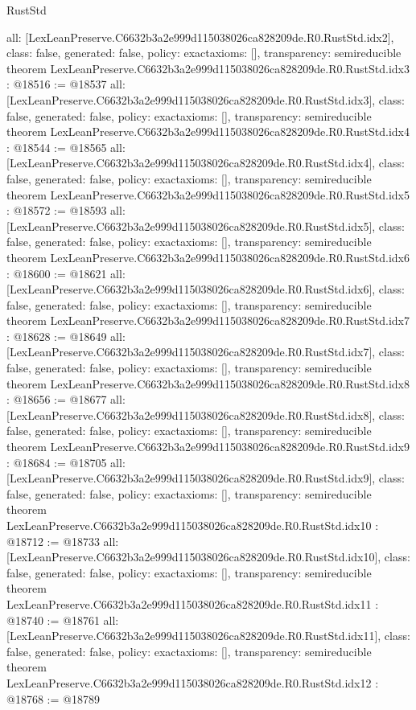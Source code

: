 \begin{lexlean}{RustStd}
\begin{coremodule}
{  all: [LexLeanPreserve.C6632b3a2e999d115038026ca828209de.R0.RustStd.idx2],
  class: false,
  generated: false,
  policy: exact{axioms: []},
  transparency: semireducible
}
theorem LexLeanPreserve.C6632b3a2e999d115038026ca828209de.R0.RustStd.idx3 : @18516 := @18537 {
  all: [LexLeanPreserve.C6632b3a2e999d115038026ca828209de.R0.RustStd.idx3],
  class: false,
  generated: false,
  policy: exact{axioms: []},
  transparency: semireducible
}
theorem LexLeanPreserve.C6632b3a2e999d115038026ca828209de.R0.RustStd.idx4 : @18544 := @18565 {
  all: [LexLeanPreserve.C6632b3a2e999d115038026ca828209de.R0.RustStd.idx4],
  class: false,
  generated: false,
  policy: exact{axioms: []},
  transparency: semireducible
}
theorem LexLeanPreserve.C6632b3a2e999d115038026ca828209de.R0.RustStd.idx5 : @18572 := @18593 {
  all: [LexLeanPreserve.C6632b3a2e999d115038026ca828209de.R0.RustStd.idx5],
  class: false,
  generated: false,
  policy: exact{axioms: []},
  transparency: semireducible
}
theorem LexLeanPreserve.C6632b3a2e999d115038026ca828209de.R0.RustStd.idx6 : @18600 := @18621 {
  all: [LexLeanPreserve.C6632b3a2e999d115038026ca828209de.R0.RustStd.idx6],
  class: false,
  generated: false,
  policy: exact{axioms: []},
  transparency: semireducible
}
theorem LexLeanPreserve.C6632b3a2e999d115038026ca828209de.R0.RustStd.idx7 : @18628 := @18649 {
  all: [LexLeanPreserve.C6632b3a2e999d115038026ca828209de.R0.RustStd.idx7],
  class: false,
  generated: false,
  policy: exact{axioms: []},
  transparency: semireducible
}
theorem LexLeanPreserve.C6632b3a2e999d115038026ca828209de.R0.RustStd.idx8 : @18656 := @18677 {
  all: [LexLeanPreserve.C6632b3a2e999d115038026ca828209de.R0.RustStd.idx8],
  class: false,
  generated: false,
  policy: exact{axioms: []},
  transparency: semireducible
}
theorem LexLeanPreserve.C6632b3a2e999d115038026ca828209de.R0.RustStd.idx9 : @18684 := @18705 {
  all: [LexLeanPreserve.C6632b3a2e999d115038026ca828209de.R0.RustStd.idx9],
  class: false,
  generated: false,
  policy: exact{axioms: []},
  transparency: semireducible
}
theorem LexLeanPreserve.C6632b3a2e999d115038026ca828209de.R0.RustStd.idx10 : @18712 := @18733 {
  all: [LexLeanPreserve.C6632b3a2e999d115038026ca828209de.R0.RustStd.idx10],
  class: false,
  generated: false,
  policy: exact{axioms: []},
  transparency: semireducible
}
theorem LexLeanPreserve.C6632b3a2e999d115038026ca828209de.R0.RustStd.idx11 : @18740 := @18761 {
  all: [LexLeanPreserve.C6632b3a2e999d115038026ca828209de.R0.RustStd.idx11],
  class: false,
  generated: false,
  policy: exact{axioms: []},
  transparency: semireducible
}
theorem LexLeanPreserve.C6632b3a2e999d115038026ca828209de.R0.RustStd.idx12 : @18768 := @18789 {
}
\end{coremodule}
\end{lexlean}
